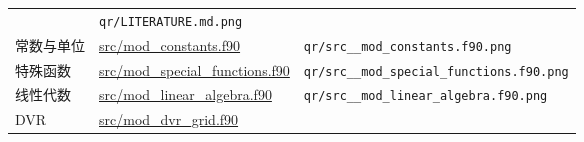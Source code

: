 \documentclass[
]{ctexbook}
\begin{document}
\begin{longtable}[]{@{}lll@{}}
\begin{minipage}[t]{0.30\columnwidth}
\end{minipage} & \begin{minipage}[t]{0.30\columnwidth}\raggedright
\texttt{qr/LITERATURE.md.png}\strut
\end{minipage}\tabularnewline
\begin{minipage}[t]{0.30\columnwidth}\raggedright
常数与单位\strut
\end{minipage} & \begin{minipage}[t]{0.30\columnwidth}\raggedright
\href{https://github.com/l1Ha/QuantumGeneralModule/blob/main/src/mod_constants.f90}{src/mod\_constants.f90}\strut
\end{minipage} & \begin{minipage}[t]{0.30\columnwidth}\raggedright
\texttt{qr/src\_\_mod\_constants.f90.png}\strut
\end{minipage}\tabularnewline
\begin{minipage}[t]{0.30\columnwidth}\raggedright
特殊函数\strut
\end{minipage} & \begin{minipage}[t]{0.30\columnwidth}\raggedright
\href{https://github.com/l1Ha/QuantumGeneralModule/blob/main/src/mod_special_functions.f90}{src/mod\_special\_functions.f90}\strut
\end{minipage} & \begin{minipage}[t]{0.30\columnwidth}\raggedright
\texttt{qr/src\_\_mod\_special\_functions.f90.png}\strut
\end{minipage}\tabularnewline
\begin{minipage}[t]{0.30\columnwidth}\raggedright
线性代数\strut
\end{minipage} & \begin{minipage}[t]{0.30\columnwidth}\raggedright
\href{https://github.com/l1Ha/QuantumGeneralModule/blob/main/src/mod_linear_algebra.f90}{src/mod\_linear\_algebra.f90}\strut
\end{minipage} & \begin{minipage}[t]{0.30\columnwidth}\raggedright
\texttt{qr/src\_\_mod\_linear\_algebra.f90.png}\strut
\end{minipage}\tabularnewline
\begin{minipage}[t]{0.30\columnwidth}\raggedright
DVR\strut
\end{minipage} & \begin{minipage}[t]{0.30\columnwidth}\raggedright
\href{https://github.com/l1Ha/QuantumGeneralModule/blob/main/src/mod_dvr_grid.f90}{src/mod\_dvr\_grid.f90}\strut
\end{minipage} & \begin{minipage}[t]{0.30\columnwidth}\raggedright

\end{minipage}
\end{longtable}
\end{document}
